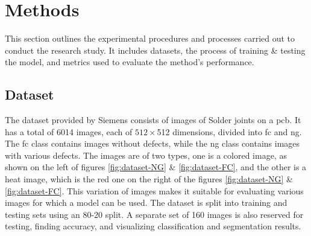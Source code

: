 \chapter{Methods}

This section outlines the experimental procedures and processes carried out to conduct the research study. It includes datasets, the process of training \& testing the model, and metrics used to evaluate the method's performance.

\section{Dataset}
The dataset provided by Siemens consists of images of Solder joints on a \gls{pcb}. It has a total of 6014 images, each of $512 \times $512 dimensions, divided into \gls{fc} and \gls{ng}. The \gls{fc} class contains images without defects, while the \gls{ng} class contains images with various defects. The images are of two types, one is a colored image, as shown on the left of figures \ref{fig:dataset-NG} \& \ref{fig:dataset-FC}, and the other is a heat image, which is the red one on the right of the figures \ref{fig:dataset-NG} \& \ref{fig:dataset-FC}. This variation of images makes it suitable for evaluating various images for which a model can be used. The dataset is split into training and testing sets using an 80-20 split. A separate set of 160 images is also reserved for testing, finding accuracy, and visualizing classification and segmentation results.


